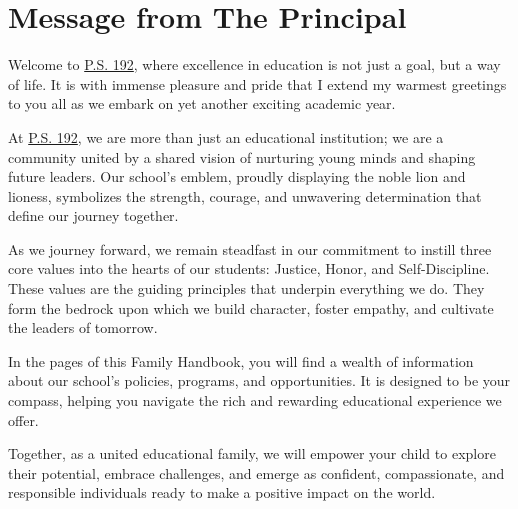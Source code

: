 \documentclass[11pt, letterpaper]{article}
\begin{document}
\sloppy



\pagenumbering{\fancyhf{}}
\pagestyle{headings}
\fancyhead[R]{\thepage}
\pagestyle{fancy}
\renewcommand{\footrulewidth}{1 px}


\newpage
\tableofcontents
\newpage

\section{Message from The Principal}
Welcome to \href{https://www.ps192.org}{P.S. 192}, where excellence in education is not just a goal, but a way of life. It is with immense pleasure and pride that I extend my warmest greetings to you all as we embark on yet another exciting academic year.

At \href{https://www.ps192.org}{P.S. 192}, we are more than just an educational institution; we are a community united by a shared vision of nurturing young minds and shaping future leaders. Our school's emblem, proudly displaying the noble lion and lioness, symbolizes the strength, courage, and unwavering determination that define our journey together.

As we journey forward, we remain steadfast in our commitment to instill three core values into the hearts of our students: Justice, Honor, and Self-Discipline. These values are the guiding principles that underpin everything we do. They form the bedrock upon which we build character, foster empathy, and cultivate the leaders of tomorrow.

In the pages of this Family Handbook, you will find a wealth of information about our school's policies, programs, and opportunities. It is designed to be your compass, helping you navigate the rich and rewarding educational experience we offer.

Together, as a united educational family, we will empower your child to explore their potential, embrace challenges, and emerge as confident, compassionate, and responsible individuals ready to make a positive impact on the world.
\end{document}
